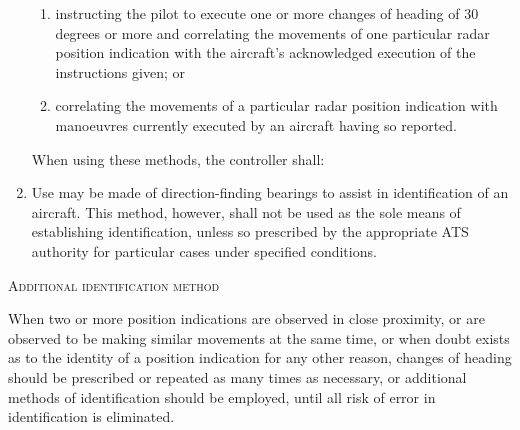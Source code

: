 \begin{enumeratesc}
\begin{enumerate}
\begin{enumalph}
            \begin{enumerate}[label=---,labelsep=0.3cm,leftmargin=*,labelindent=0pt]
                \item instructing the pilot to execute one or more changes of heading of 30 degrees or more and correlating the movements of one particular radar position indication with the aircraft's acknowledged execution of the instructions given; or
                \item correlating the movements of a particular radar position indication with manoeuvres currently executed by an aircraft having so reported.
            \end{enumerate}
            
            \noindent When using these methods, the controller shall:
            
        
        \end{enumalph}
    
        \item Use may be made of direction-finding bearings to assist in identification of an aircraft. This method, however, shall not be used as the sole means of establishing identification, unless so prescribed by the appropriate ATS authority for particular cases under specified conditions.
    \end{enumerate}

    \item \textsc{Additional identification method} \label{8.6.2.5}
    \begin{enumempty}
        \item When two or more position indications are observed in close proximity, or are observed to be making similar movements at the same time, or when doubt exists as to the identity of a position indication for any other reason, changes of heading should be prescribed or repeated as many times as necessary, or additional methods of identification should be employed, until all risk of error in identification is eliminated.
    \end{enumempty}    
\end{enumeratesc}

